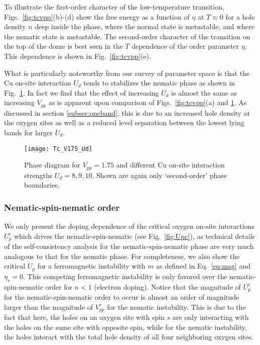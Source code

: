 \documentclass[prb, twocolumn,showpacs,preprintnumbers,amsmath,amssymb, floatfix]{revtex4}
\begin{document}
To illustrate the first-order character of the low-temperature transition, Figs.~\ref{fig:tcvpp}(b)-(d) show the free energy as a function of $\eta$ at $T\approx 0$ for a hole density $n$ deep inside the phase, where the normal state is metastable, and where the nematic state is metastable. The second-order character of the transition on the top of the dome is best seen in the $T$ dependence of the order parameter $\eta$. This dependence is shown in Fig.~\ref{fig:tcvpp}(e).  

What is particularly noteworthy from our survey of parameter space is
that the Cu on-site interaction $U_d$ tends to stabilizes the
nematic phase as shown in Fig.~\ref{fig:tcud}.
In fact we find that the effect of
increasing $U_d$ is almost the same as increasing $V_{pp}$ as is
apparent upon comparison of Figs.~\ref{fig:tcvpp}(a) and
\ref{fig:tcud}.
As discussed in section \ref{subsec:oneband},
this is due to an increased hole density at the oxygen sites as well as a reduced level separation between the lowest lying bands for larger $U_d$.
\begin{figure}[tb]
  \begin{center}
    \texttt{[image: Tc\_V175\_Ud]}
  \end{center}
  \caption{Phase diagram for $V_{pp} = 1.75$ and different Cu on-site interaction strengths $U_{d}=8, 9, 10$. Shown are again only `second-order' phase boundaries.}
  \label{fig:tcud}
\end{figure}


\subsubsection{Nematic-spin-nematic order}
We only present
the doping
dependence of the critical
oxygen on-site interactions $U_p^c$ which drives the
nematic-spin-nematic (see  
Fig.~\ref{fig:Upc}), as technical details of 
the self-consistency analysis for the nematic-spin-nematic phase are
very much analogous to that for the nematic phase.
For
completeness, we also show the critical $U_p$ for a
ferromagnetic instability with $m$ as defined in Eq.~\eqref{eq:mag} 
and $\eta_s=0$. This competing ferromagnetic instability is only
favored over the nematic-spin-nematic order for $n<1$ (electron doping).
Notice  that
the magnitude of  $U_p^c$ 
for the nematic-spin-nematic order to occur is almost an order of
magnitude larger than the magnitude of $V_{pp}^c$
for the nematic instability. 
This is due to the fact that here, the holes on an oxygen site with spin
$s$ are only interacting with the holes on the same site with opposite
spin, while for the nematic instability, the holes interact with the total
hole density of all four neighboring oxygen sites.
\end{document}

